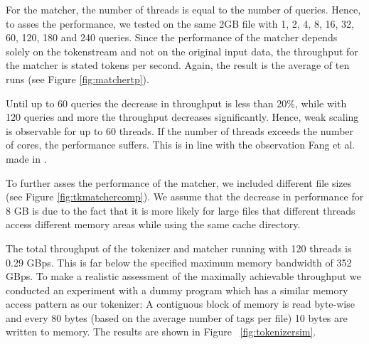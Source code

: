 For the matcher, the number of threads is equal to the number of queries. Hence,
to asses the performance, we tested on the same 2GB file with 1, 2, 4, 8, 16,
32, 60, 120, 180 and 240 queries. Since the performance of the matcher depends
solely on the tokenstream and not on the original input data, the throughput for
the matcher is stated tokens per second. Again, the result is the average of ten
runs (see Figure \ref{fig:matchertp}).

Until up to 60 queries the decrease in throughput is less than 20\%, while with
120 queries and more the throughput decreases significantly. Hence, weak scaling
is observable for up to 60 threads. If the number of threads exceeds the number
of cores, the performance suffers. This is in line with the observation Fang et
al. made in \cite{Fang14}.

To further asses the performance of the matcher, we included different file
sizes (see Figure \ref{fig:tkmatchercomp}). We assume that the decrease in
performance for 8 GB is due to the fact that it is more likely for large files
that different threads access different memory areas while using the same cache
directory.

The total throughput of the tokenizer and matcher running with 120 threads is
0.29 GBps. This is far below the specified maximum memory bandwidth of 352
GBps. To make a realistic assessment of the maximally achievable throughput
we conducted an experiment with a dummy program which has a similar memory
access pattern as our tokenizer: A contiguous block of memory is read byte-wise
and every 80 bytes (based on the average number of tags per file) 10 bytes are
written to memory. The results are shown in Figure ~\ref{fig:tokenizersim}.
